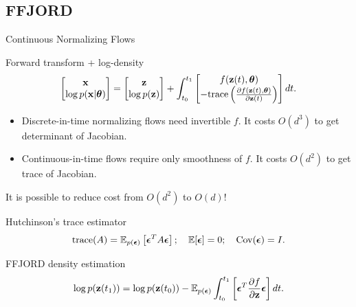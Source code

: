 \subsection{FFJORD}
\begin{frame}{Continuous Normalizing Flows}
	\begin{block}{Forward transform + log-density}
		\vspace{-0.8cm}
		\[
			\begin{bmatrix}
				\mathbf{x} \\
				\log p(\mathbf{x} | \boldsymbol{\theta})
			\end{bmatrix}
			= 
			\begin{bmatrix}
				\mathbf{z} \\
				\log p(\mathbf{z})
			\end{bmatrix} + 
			\int_{t_0}^{t_1} 
			\begin{bmatrix}
				f(\mathbf{z}(t), \boldsymbol{\theta}) \\
				- \text{trace} \left( \frac{\partial f(\mathbf{z}(t), \boldsymbol{\theta})}{\partial \mathbf{z}(t)} \right) 
			\end{bmatrix} dt.
		\]
		\vspace{-0.4cm}
	\end{block}
	\begin{itemize}
		\item Discrete-in-time normalizing flows need invertible $f$. It costs $O(d^3)$ to get determinant of Jacobian.
		\item Continuous-in-time flows require only smoothness of $f$. It costs $O(d^2)$ to get trace of Jacobian.
	\end{itemize}
	It is possible to reduce cost from $O(d^2)$ to $O(d)$!
	\begin{block}{Hutchinson's trace estimator}
		\vspace{-0.3cm}
		\[
		    \text{trace}(A) = \mathbb{E}_{p(\boldsymbol{\epsilon})} \left[ \boldsymbol{\epsilon}^T A \boldsymbol{\epsilon} \right]; \quad \mathbb{E} [\boldsymbol{\epsilon}] = 0; \quad \text{Cov} (\boldsymbol{\epsilon}) = I.
		\]
		\vspace{-0.5cm}
	\end{block}
	\begin{block}{FFJORD density estimation}
		\vspace{-0.4cm}
		\[
		    \log p(\mathbf{z}(t_1)) = \log p(\mathbf{z}(t_0)) - \mathbb{E}_{p(\boldsymbol{\epsilon})} \int_{t_0}^{t_1} \left[ \boldsymbol{\epsilon}^T \frac{\partial f}{\partial \mathbf{z}} \boldsymbol{\epsilon} \right] dt.
		\]
	\end{block}
\end{frame}
